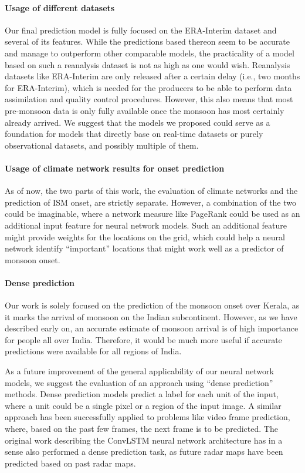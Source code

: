 \paragraph{Usage of different datasets}
Our final prediction model is fully focused on the ERA-Interim dataset and several of its features. While the predictions based thereon seem to be accurate and manage to outperform other comparable models, the practicality of a model based on such a reanalysis dataset is not as high as one would wish. Reanalysis datasets like ERA-Interim are only released after a certain delay (i.e., two months for ERA-Interim), which is needed for the producers to be able to perform data assimilation and quality control procedures. However, this also means that most pre-monsoon data is only fully available once the monsoon has most certainly already arrived. We suggest that the models we proposed could serve as a foundation for models that directly base on real-time datasets or purely observational datasets, and possibly multiple of them.

\paragraph{Usage of climate network results for onset prediction}
As of now, the two parts of this work, the evaluation of climate networks and the prediction of ISM onset, are strictly separate. However, a combination of the two could be imaginable, where a network measure like PageRank could be used as an additional input feature for neural network models. Such an additional feature might provide weights for the locations on the grid, which could help a neural network identify ``important'' locations that might work well as a predictor of monsoon onset.

\paragraph{Dense prediction}
Our work is solely focused on the prediction of the monsoon onset over Kerala, as it marks the arrival of monsoon on the Indian subcontinent. However, as we have described early on, an accurate estimate of monsoon arrival is of high importance for people all over India. Therefore, it would be much more useful if accurate predictions were available for all regions of India.

As a future improvement of the general applicability of our neural network models, we suggest the evaluation of an approach using ``dense prediction'' methods. Dense prediction models predict a label for each unit of the input, where a unit could be a single pixel or a region of the input image. A similar approach has been successfully applied to problems like video frame prediction, where, based on the past few frames, the next frame is to be predicted. The original work describing the ConvLSTM neural network architecture has in a sense also performed a dense prediction task, as future radar maps have been predicted based on past radar maps.

